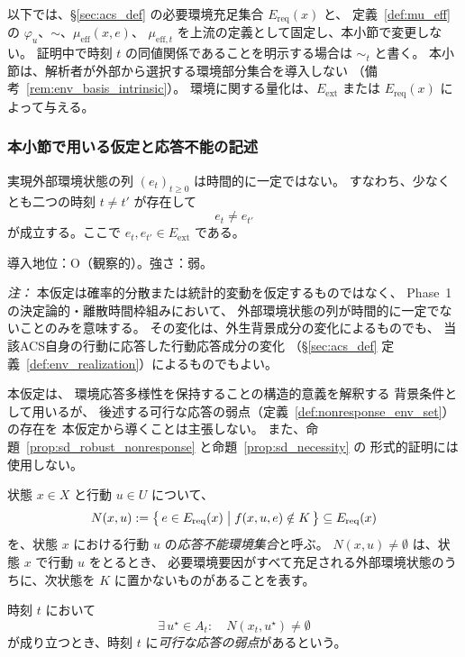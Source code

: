 以下では、\S\ref{sec:acs_def} の必要環境充足集合 $E_{\mathrm{req}}(x)$ と、
定義~\ref{def:mu_eff} の $\varphi_u$、$\sim$、$\mu_{\mathrm{eff}}(x,e)$、
$\mu_{\mathrm{eff},t}$ を上流の定義として固定し、本小節で変更しない。
証明中で時刻 $t$ の同値関係であることを明示する場合は $\sim_t$ と書く。
本小節は、解析者が外部から選択する環境部分集合を導入しない
（備考~\ref{rem:env_basis_intrinsic}）。
環境に関する量化は、$E_{\mathrm{ext}}$ または
$E_{\mathrm{req}}(x)$ によって与える。

\subsubsection{本小節で用いる仮定と応答不能の記述}

\begin{assumption}[非定常環境]
\label{ass:nonstationary}
実現外部環境状態の列 $(e_t)_{t\ge0}$ は時間的に一定ではない。
すなわち、少なくとも二つの時刻 $t\neq t'$ が存在して
\[
  e_t\neq e_{t'}
\]
が成立する。ここで $e_t,e_{t'}\in E_{\mathrm{ext}}$ である。

導入地位：O（観察的）。強さ：弱。

\textit{注：}
本仮定は確率的分散または統計的変動を仮定するものではなく、
Phase~1 の決定論的・離散時間枠組みにおいて、
外部環境状態の列が時間的に一定でないことのみを意味する。
その変化は、外生背景成分の変化によるものでも、
当該ACS自身の行動に応答した行動応答成分の変化
（\S\ref{sec:acs_def} 定義~\ref{def:env_realization}）によるものでもよい。

本仮定は、
環境応答多様性を保持することの構造的意義を解釈する
背景条件として用いるが、
後述する可行な応答の弱点（定義~\ref{def:nonresponse_env_set}）の存在を
本仮定から導くことは主張しない。
また、命題~\ref{prop:sd_robust_nonresponse} と命題~\ref{prop:sd_necessity} の
形式的証明には使用しない。
\end{assumption}

\begin{definition}
\label{def:nonresponse_env_set}
状態 $x\in X$ と行動 $u\in U$ について、
\[
  N(x,u)
  :=
  \bigl\{\,e\in E_{\mathrm{req}}(x)\bigm| f(x,u,e)\notin K\,\bigr\}
  \subseteq E_{\mathrm{req}}(x)
\]
を、状態 $x$ における行動 $u$ の\emph{応答不能環境集合}と呼ぶ。
$N(x,u)\neq\emptyset$ は、状態 $x$ で行動 $u$ をとるとき、
必要環境要因がすべて充足される外部環境状態のうちに、次状態を $K$ に置かないものがあることを表す。

時刻 $t$ において
\[
  \exists\,u^\star\in A_t:\quad N(x_t,u^\star)\neq\emptyset
\]
が成り立つとき、時刻 $t$ に\emph{可行な応答の弱点}があるという。
\end{definition}

